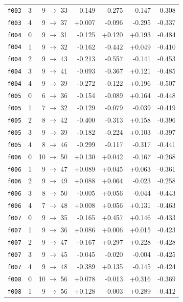 \documentclass[11pt]{article}
\begin{document}
\begin{table}[htbp]
\begin{tabular}{llrrrrr}
\texttt{f003} & 3 & 9 $\to$ 33 & -0.149 & -0.275 & -0.147 & -0.308 \\
\texttt{f003} & 4 & 9 $\to$ 37 & +0.007 & -0.096 & -0.295 & -0.337 \\
\texttt{f004} & 0 & 9 $\to$ 31 & -0.125 & +0.120 & +0.193 & -0.484 \\
\texttt{f004} & 1 & 9 $\to$ 32 & -0.162 & -0.442 & +0.049 & -0.410 \\
\texttt{f004} & 2 & 9 $\to$ 43 & -0.213 & -0.557 & -0.141 & -0.453 \\
\texttt{f004} & 3 & 9 $\to$ 41 & -0.093 & -0.367 & +0.121 & -0.485 \\
\texttt{f004} & 4 & 9 $\to$ 39 & -0.272 & -0.122 & +0.196 & -0.507 \\
\texttt{f005} & 0 & 6 $\to$ 36 & -0.154 & -0.089 & +0.164 & -0.448 \\
\texttt{f005} & 1 & 7 $\to$ 32 & -0.129 & -0.079 & -0.039 & -0.419 \\
\texttt{f005} & 2 & 8 $\to$ 42 & -0.400 & -0.313 & +0.158 & -0.396 \\
\texttt{f005} & 3 & 9 $\to$ 39 & -0.182 & -0.224 & +0.103 & -0.397 \\
\texttt{f005} & 4 & 8 $\to$ 46 & -0.299 & -0.117 & -0.317 & -0.441 \\
\texttt{f006} & 0 & 10 $\to$ 50 & +0.130 & +0.042 & -0.167 & -0.268 \\
\texttt{f006} & 1 & 9 $\to$ 47 & +0.089 & +0.045 & +0.063 & -0.361 \\
\texttt{f006} & 2 & 9 $\to$ 49 & +0.088 & +0.064 & -0.023 & -0.258 \\
\texttt{f006} & 3 & 8 $\to$ 50 & -0.005 & +0.056 & -0.044 & -0.443 \\
\texttt{f006} & 4 & 7 $\to$ 48 & +0.008 & +0.056 & +0.131 & -0.463 \\
\texttt{f007} & 0 & 9 $\to$ 35 & -0.165 & +0.457 & +0.146 & -0.433 \\
\texttt{f007} & 1 & 9 $\to$ 36 & +0.086 & +0.006 & +0.015 & -0.423 \\
\texttt{f007} & 2 & 9 $\to$ 47 & -0.167 & +0.297 & +0.228 & -0.428 \\
\texttt{f007} & 3 & 9 $\to$ 45 & -0.045 & -0.020 & -0.004 & -0.425 \\
\texttt{f007} & 4 & 9 $\to$ 48 & -0.389 & +0.135 & -0.145 & -0.424 \\
\texttt{f008} & 0 & 10 $\to$ 56 & +0.078 & -0.013 & +0.316 & -0.369 \\
\texttt{f008} & 1 & 9 $\to$ 56 & +0.128 & -0.003 & +0.289 & -0.412 \\

\end{tabular}
\end{table}
\end{document}
